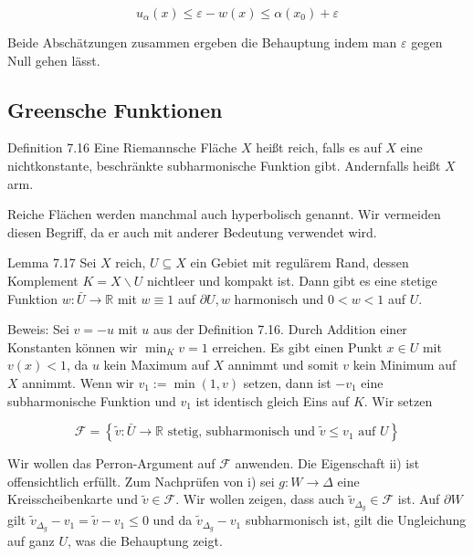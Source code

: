 \documentclass[10pt, letterpaper]{article}
\begin{document}
$$
u_{\alpha}(x) \leq \varepsilon-w(x) \leq \alpha\left(x_{0}\right)+\varepsilon
$$

Beide Abschätzungen zusammen ergeben die Behauptung indem man $\varepsilon$ gegen Null gehen lässt.

\subsection {Greensche Funktionen}
Definition 7.16 Eine Riemannsche Fläche $X$ heißt reich, falls es auf $X$ eine nichtkonstante, beschränkte subharmonische Funktion gibt. Andernfalls heißt $X$ arm.

Reiche Flächen werden manchmal auch hyperbolisch genannt. Wir vermeiden diesen Begriff, da er auch mit anderer Bedeutung verwendet wird.

Lemma 7.17 Sei $X$ reich, $U \subseteq X$ ein Gebiet mit regulärem Rand, dessen Komplement $K=X \backslash U$ nichtleer und kompakt ist. Dann gibt es eine stetige Funktion $w: \bar{U} \rightarrow \mathbb{R}$ mit $w \equiv 1$ auf $\partial U, w$ harmonisch und $0<w<1$ auf $U$.

Beweis: Sei $v=-u$ mit $u$ aus der Definition 7.16. Durch Addition einer Konstanten können wir $\min _{K} v=1$ erreichen. Es gibt einen Punkt $x \in U$ mit $v(x)<1$, da $u$ kein Maximum auf $X$ annimmt und somit $v$ kein Minimum auf $X$ annimmt. Wenn wir $v_{1}:=\min (1, v)$ setzen, dann ist $-v_{1}$ eine subharmonische Funktion und $v_{1}$ ist identisch gleich Eins auf $K$. Wir setzen

$$
\mathcal{F}=\left\{\widetilde{v}: \bar{U} \rightarrow \mathbb{R} \text { stetig, subharmonisch und } \widetilde{v} \leq v_{1} \text { auf } U\right\}
$$

Wir wollen das Perron-Argument auf $\mathcal{F}$ anwenden. Die Eigenschaft ii) ist offensichtlich erfüllt. Zum Nachprüfen von i) sei $g: W \rightarrow \Delta$ eine Kreisscheibenkarte und $\widetilde{v} \in \mathcal{F}$. Wir wollen zeigen, dass auch $\widetilde{v}_{\Delta_{g}} \in \mathcal{F}$ ist. Auf $\partial W$ gilt $\widetilde{v}_{\Delta_{g}}-v_{1}=\widetilde{v}-v_{1} \leq 0$ und da $\widetilde{v}_{\Delta_{g}}-v_{1}$ subharmonisch ist, gilt die Ungleichung auf ganz $U$, was die Behauptung zeigt.
\end{document}
